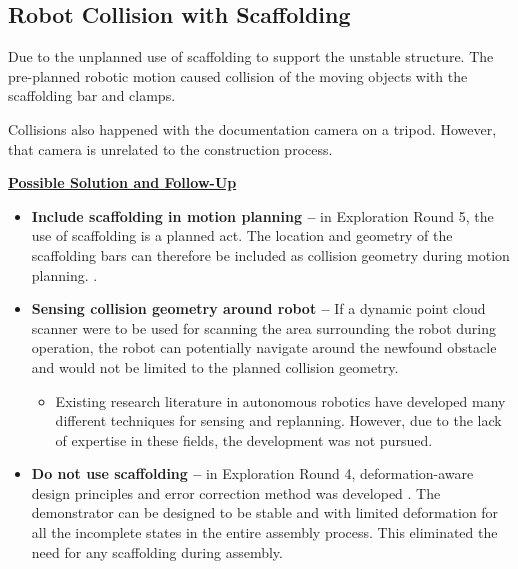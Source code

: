 \subsection{Robot Collision with Scaffolding}
\label{subsection:exploration-3-robot-collision-with-scaffolding}

Due to the unplanned use of scaffolding to support the unstable structure. The pre-planned robotic motion caused collision of the moving objects with the scaffolding bar and clamps. 






Collisions also happened with the documentation camera on a tripod. However, that camera is unrelated to the construction process.

\textbf{\ul{Possible Solution and Follow-Up}}

\begin{itemize}
	\item \textbf{Include scaffolding in motion planning --} in Exploration Round 5, the use of scaffolding is a planned act. The location and geometry of the scaffolding bars can therefore be included as collision geometry during motion planning. .

	\item \textbf{Sensing collision geometry around robot --} If a dynamic point cloud scanner were to be used for scanning the area surrounding the robot during operation, the robot can potentially navigate around the newfound obstacle and would not be limited to the planned collision geometry. 

\begin{itemize}
	\item Existing research literature in autonomous robotics have developed many different techniques for sensing and replanning. \parencite{elbanhawiSamplingBasedRobotMotion2014} However, due to the lack of expertise in these fields, the development was not pursued.

\end{itemize}
	\item \textbf{Do not use scaffolding --} in Exploration Round 4, deformation-aware design principles and error correction method was developed . The demonstrator can be designed to be stable and with limited deformation for all the incomplete states in the entire assembly process. This eliminated the need for any scaffolding during assembly. 

\end{itemize}

